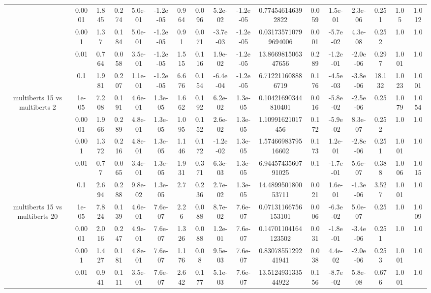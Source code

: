 \begin{tabular}{|c|c|c|c|c|c|c|c|c|c|c|c|c|c|c|c|c|}
 & 0.0001 & 1.845 & 0.274 & 5.0e-01 & -1.2e-05 & 0.964 & 0.096 & 5.2e-02 & -1.2e-05 & 0.774546146392822 & 0.059 & 1.5e-01 & 2.3e-06 & 0.251 & 1.05 & 1.012 \\
 & 0.001 & 1.37 & 0.184 & 5.0e-01 & -1.2e-05 & 0.91 & 0.071 & -3.7e-03 & -1.2e-05 & 0.031735710799694006 & 0.001 & -5.7e-02 & 4.3e-08 & 0.252 & 1.0 & 1.0 \\
 & 0.01 & 0.764 & 0.058 & 3.5e-01 & -1.2e-05 & 1.515 & 0.116 & 1.9e-02 & -1.2e-05 & 13.866981506347656 & 0.289 & -1.2e-01 & -2.0e-06 & 0.297 & 1.001 & 1.0 \\
 & 0.1 & 1.981 & 0.207 & 1.1e-01 & -1.2e-05 & 6.676 & 0.154 & -6.4e-04 & -1.2e-05 & 6.712211608886719 & 0.176 & -4.5e-03 & -3.8e-06 & 18.132 & 1.023 & 1.001 \\
\hline
\multirow{5}{*}{multiberts 15 vs multiberts 2} & 1e-05 & 7.208 & 0.191 & 4.6e-01 & 1.3e-05 & 1.662 & 0.192 & 6.2e-02 & 1.3e-05 & 0.10421690344810401 & 0.016 & -5.8e-02 & -2.5e-06 & 0.25 & 1.079 & 1.054 \\
 & 0.0001 & 1.966 & 0.289 & 4.8e-01 & 1.3e-05 & 1.095 & 0.152 & 2.6e-02 & 1.3e-05 & 1.10991621017456 & 0.172 & -5.9e-02 & 8.3e-07 & 0.252 & 1.0 & 1.0 \\
 & 0.001 & 1.372 & 0.216 & 4.8e-01 & 1.3e-05 & 1.146 & 0.172 & -1.2e-02 & 1.3e-05 & 1.5746698379516602 & 0.173 & 1.2e-01 & -2.8e-06 & 0.251 & 1.001 & 1.0 \\
 & 0.01 & 0.77 & 0.065 & 3.4e-01 & 1.3e-05 & 1.931 & 0.371 & 6.3e-03 & 1.3e-05 & 6.9445743560791025 & 0.1 & -1.7e-01 & 5.6e-07 & 0.388 & 1.006 & 1.015 \\
 & 0.1 & 2.694 & 0.288 & 9.8e-02 & 1.3e-05 & 2.7 & 0.236 & 2.7e-02 & 1.3e-05 & 14.489950180053711 & 0.021 & 1.6e-01 & -1.3e-06 & 3.527 & 1.001 & 1.0 \\
\hline
\multirow{5}{*}{multiberts 15 vs multiberts 20} & 1e-05 & 7.824 & 0.139 & 4.6e-01 & 7.6e-07 & 2.26 & 0.088 & 8.7e-02 & 7.6e-07 & 0.07131166756153101 & 0.006 & -6.3e-02 & 5.0e-07 & 0.25 & 1.0 & 1.009 \\
 & 0.0001 & 2.016 & 0.247 & 4.9e-01 & 7.6e-07 & 1.326 & 0.088 & 1.2e-01 & 7.6e-07 & 0.14701104164123502 & 0.031 & -1.8e-01 & -3.4e-06 & 0.251 & 1.0 & 1.0 \\
 & 0.001 & 1.427 & 0.181 & 4.8e-01 & 7.6e-07 & 1.176 & 0.08 & 9.5e-03 & 7.6e-07 & 0.8307855129241941 & 0.038 & 4.4e-02 & -2.0e-06 & 0.253 & 1.001 & 1.0 \\
 & 0.01 & 0.941 & 0.111 & 3.5e-01 & 7.6e-07 & 2.642 & 0.177 & 5.1e-03 & 7.6e-07 & 13.512493133544922 & 0.156 & -8.7e-02 & 5.8e-08 & 0.676 & 1.001 & 1.0 \\

\end{tabular}
